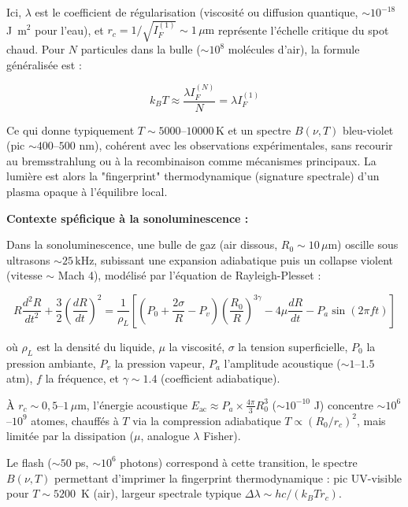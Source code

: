 \documentclass[a4paper,12pt]{article}
\begin{document}
\medskip

Ici, $\lambda$ est le coefficient de régularisation (viscosité ou diffusion quantique, $\sim 10^{-18}$ J~m$^2$ pour l'eau), et $r_c = 1/\sqrt{I_F^{(1)}} \sim 1\,\mu\text{m}$ représente l'échelle critique du spot chaud. Pour $N$ particules dans la bulle ($\sim 10^8$ molécules d'air), la formule généralisée est :

\begin{equation}
k_B T \approx \frac{\lambda I_F^{(N)}}{N} = \lambda I_F^{(1)}
\end{equation}

Ce qui donne typiquement $T \sim 5000$--$10000\, \text{K}$ et un spectre $B(\nu, T)$ bleu-violet (pic $\sim 400$--$500$ nm), cohérent avec les observations expérimentales, sans recourir au bremsstrahlung ou à la recombinaison comme mécanismes principaux. La lumière est alors la "fingerprint" thermodynamique (signature spectrale) d'un plasma opaque à l'équilibre local.

\bigskip

\textbf{Contexte spéficique à la sonoluminescence :}

Dans la sonoluminescence, une bulle de gaz (air dissous, $R_0 \sim 10\,\mu\text{m}$) oscille sous ultrasons $\sim 25\,\text{kHz}$, subissant une expansion adiabatique puis un collapse violent (vitesse $\sim$ Mach 4), modélisé par l'équation de Rayleigh-Plesset :

\begin{equation}
R \frac{d^2R}{dt^2} + \frac{3}{2}\left(\frac{dR}{dt}\right)^2 = \frac{1}{\rho_L} \left[ \left(P_0 + \frac{2\sigma}{R} - P_v \right)\left( \frac{R_0}{R} \right)^{3\gamma} - 4\mu \frac{dR}{dt} - P_a \sin(2\pi f t)\right]
\end{equation}

où $\rho_L$ est la densité du liquide, $\mu$ la viscosité, $\sigma$ la tension superficielle, $P_0$ la pression ambiante, $P_v$ la pression vapeur, $P_a$ l'amplitude acoustique ($\sim 1$–$1.5$ atm), $f$ la fréquence, et $\gamma \sim 1.4$ (coefficient adiabatique).

À $r_c \sim 0{,}5$–$1\,\mu\text{m}$, l'énergie acoustique $E_\text{ac} \approx P_a \times \tfrac{4\pi}{3} R_0^3$ ($\sim 10^{-10}$ J) concentre $\sim 10^6$–$10^9$ atomes, chauffés à $T$ via la compression adiabatique $T \propto (R_0/r_c)^2$, mais limitée par la dissipation ($\mu$, analogue $\lambda$ Fisher).

Le flash ($\sim 50$ ps, $\sim 10^6$ photons) correspond à cette transition, le spectre $B(\nu, T)$ permettant d'imprimer la fingerprint thermodynamique : pic UV-visible pour $T \sim 5200$~K (air), largeur spectrale typique $\Delta\lambda \sim h c/(k_B T r_c)$.
\end{document}
